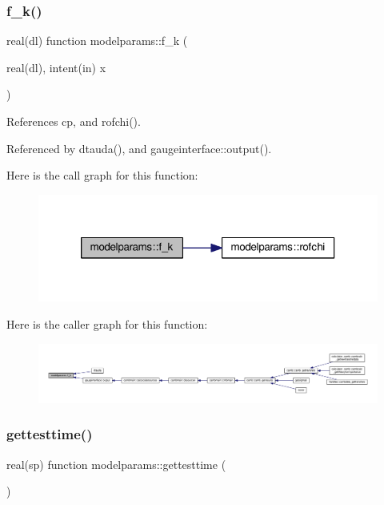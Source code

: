 \subsubsection{\texorpdfstring{f\+\_\+k()}{f\_k()}}
{\footnotesize\ttfamily real(dl) function modelparams\+::f\+\_\+k (\begin{DoxyParamCaption}\item[{real(dl), intent(in)}]{x }\end{DoxyParamCaption})}



References cp, and rofchi().



Referenced by dtauda(), and gaugeinterface\+::output().

Here is the call graph for this function\+:
\nopagebreak
\begin{figure}[H]
\begin{center}
\leavevmode
\includegraphics[width=318pt]{namespacemodelparams_ad0ec1bb07f7e0295749e801b141bfc0f_cgraph}
\end{center}
\end{figure}
Here is the caller graph for this function\+:
\nopagebreak
\begin{figure}[H]
\begin{center}
\leavevmode
\includegraphics[width=350pt]{namespacemodelparams_ad0ec1bb07f7e0295749e801b141bfc0f_icgraph}
\end{center}
\end{figure}
\mbox{\label{namespacemodelparams_a2abd5cb7bfc9c34a736d91ed5863552d}} 
\subsubsection{\texorpdfstring{gettesttime()}{gettesttime()}}
{\footnotesize\ttfamily real(sp) function modelparams\+::gettesttime (\begin{DoxyParamCaption}{ }\end{DoxyParamCaption})}



